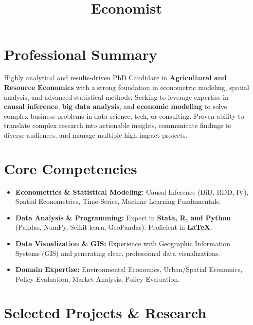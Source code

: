 \documentclass[10pt, a4paper]{letter}
\title{Economist}
\begin{document}

\makecvtitle

\section{Professional Summary}
Highly analytical and results-driven PhD Candidate in \textbf{Agricultural and Resource Economics} with a strong foundation in econometric modeling, spatial analysis, and advanced statistical methods. Seeking to leverage expertise in \textbf{causal inference}, \textbf{big data analysis}, and \textbf{economic modeling} to solve complex business problems in data science, tech, or consulting. Proven ability to translate complex research into actionable insights, communicate findings to diverse audiences, and manage multiple high-impact projects. 

\section{Core Competencies}
\begin{itemize}
    \item \textbf{Econometrics \& Statistical Modeling:} Causal Inference (DiD, RDD, IV), Spatial Econometrics, Time-Series, Machine Learning Fundamentals.
    \item \textbf{Data Analysis \& Programming:} Expert in \textbf{Stata, R, and Python} (Pandas, NumPy, Scikit-learn, GeoPandas). Proficient in \textbf{LaTeX}.
    \item \textbf{Data Visualization \& GIS:} Experience with Geographic Information Systems (GIS) and generating clear, professional data visualizations.
    \item \textbf{Domain Expertise:} Environmental Economics, Urban/Spatial Economics, Policy Evaluation, Market Analysis, Policy Evaluation.
\end{itemize}

\section{Selected Projects \& Research}
\end{document}

